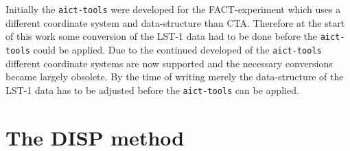 Initially the \texttt{aict-tools} were developed for the FACT-experiment which uses a different coordinate system and data-structure than CTA.
Therefore at the start of this work some conversion of the LST-1 data had to be done before the \texttt{aict-tools} could be applied.
Due to the continued developed of the \texttt{aict-tools} different coordinate systems are now supported and the necessary conversions became largely obsolete.
By the time of writing merely the data-structure of the LST-1 data has to be adjusted before the \texttt{aict-tools} can be applied.


\section{The DISP method}

